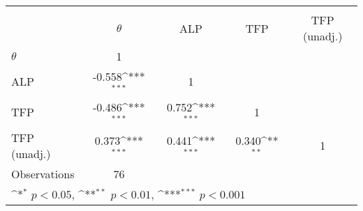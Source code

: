 {
\def\sym#1{\ifmmode^{#1}\else\(^{#1}\)\fi}
\begin{tabular}{l*{4}{c}}
\toprule
                &\multicolumn{4}{c}{}                                                       \\
                & $\theta$         &      ALP         &      TFP         &TFP (unadj.)         \\
\midrule
$\theta$        &        1         &                  &                  &                  \\
ALP             &   -0.558\sym{***}&        1         &                  &                  \\
TFP             &   -0.486\sym{***}&    0.752\sym{***}&        1         &                  \\
TFP (unadj.)    &    0.373\sym{***}&    0.441\sym{***}&    0.340\sym{**} &        1         \\
\midrule
Observations    &       76         &                  &                  &                  \\
\bottomrule
\multicolumn{5}{l}{\footnotesize \sym{*} \(p<0.05\), \sym{**} \(p<0.01\), \sym{***} \(p<0.001\)}\\
\end{tabular}
}
